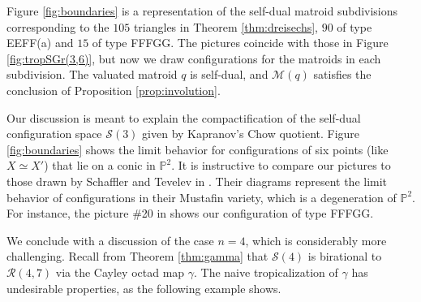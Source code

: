 \documentclass[12pt]{extarticle}
\theoremstyle{definition}
\numberwithin{theorem}{section}
\theoremstyle{plain}\newtheorem{ithm}{Theorem}
\newcommand{\PP}{\mathbb{P}}
\begin{document}
Figure \ref{fig:boundaries} is a representation of the self-dual matroid subdivisions
corresponding to the $105$ triangles in Theorem  \ref{thm:dreisechs},
$90$ of type EEFF(a) and $15$ of type FFFGG.
The pictures coincide with those in Figure \ref{fig:tropSGr(3,6)}, but now
we draw configurations for the matroids in 
each subdivision.
The valuated matroid $q$ is self-dual,
and $\mathcal{M}(q)$ satisfies the conclusion of Proposition \ref{prop:involution}.

Our discussion  is meant to explain the compactification of 
the self-dual configuration space $\mathcal{S}(3)$ given by
Kapranov's Chow quotient.
Figure \ref{fig:boundaries} shows the limit behavior for 
configurations of six points (like $X \simeq X'$)
that lie on a conic in $\PP^2$.
It is instructive to compare our pictures to 
those drawn by Schaffler and Tevelev in \cite{SchaffTev}.
Their diagrams represent the limit behavior of configurations in their Mustafin variety, which is a degeneration of $\PP^2$.
For instance, the picture \#20 in \cite[Table 15]{SchaffTev}
shows our configuration of type FFFGG.


We conclude with a discussion of
the case $n=4$, which is considerably more challenging.
Recall from Theorem \ref{thm:gamma}
 that $\mathcal{S}(4)$ is birational to $\mathcal{R}(4,7)$ via
the Cayley octad map $\gamma$.
The naive tropicalization of $\gamma$ 
has undesirable properties,
as the following example shows.
\end{document}
